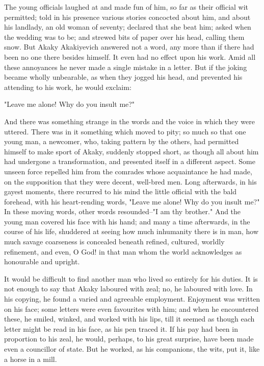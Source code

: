 The young officials laughed at and made fun of him, so far as their
official wit permitted; told in his presence various stories concocted
about him, and about his landlady, an old woman of seventy; declared
that she beat him; asked when the wedding was to be; and strewed bits
of paper over his head, calling them snow. But Akaky Akakiyevich
answered not a word, any more than if there had been no one there
besides himself. It even had no effect upon his work. Amid all these
annoyances he never made a single mistake in a letter. But if the
joking became wholly unbearable, as when they jogged his head, and
prevented his attending to his work, he would exclaim:

"Leave me alone! Why do you insult me?"

And there was something strange in the words and the voice in which
they were uttered. There was in it something which moved to pity; so
much so that one young man, a newcomer, who, taking pattern by the
others, had permitted himself to make sport of Akaky, suddenly stopped
short, as though all about him had undergone a transformation, and
presented itself in a different aspect. Some unseen force repelled him
from the comrades whose acquaintance he had made, on the supposition
that they were decent, well-bred men. Long afterwards, in his gayest
moments, there recurred to his mind the little official with the bald
forehead, with his heart-rending words, "Leave me alone! Why do you
insult me?" In these moving words, other words resounded--"I am thy
brother." And the young man covered his face with his hand; and many a
time afterwards, in the course of his life, shuddered at seeing how
much inhumanity there is in man, how much savage coarseness is
concealed beneath refined, cultured, worldly refinement, and even, O
God! in that man whom the world acknowledges as honourable and
upright.

It would be difficult to find another man who lived so entirely for
his duties. It is not enough to say that Akaky laboured with zeal; no,
he laboured with love. In his copying, he found a varied and agreeable
employment. Enjoyment was written on his face; some letters were even
favourites with him; and when he encountered these, he smiled, winked,
and worked with his lips, till it seemed as though each letter might
be read in his face, as his pen traced it. If his pay had been in
proportion to his zeal, he would, perhaps, to his great surprise, have
been made even a councillor of state. But he worked, as his
companions, the wits, put it, like a horse in a mill.

